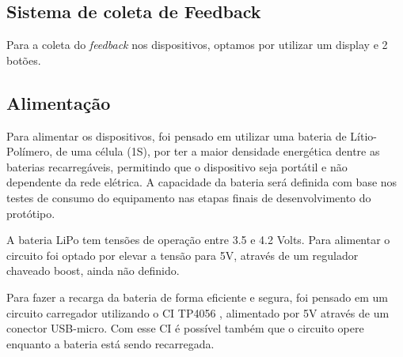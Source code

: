 \documentclass[../monografia.tex]{subfiles}
\begin{document}
\subsection{Sistema de coleta de Feedback}

Para a coleta do \textit{feedback} nos dispositivos, optamos por utilizar um display e 2 botões. 

\subsection{Alimentação}

Para alimentar os dispositivos, foi pensado em utilizar uma bateria de Lítio-Polímero, de uma célula (1S), por ter a maior densidade energética dentre as baterias recarregáveis, permitindo que o dispositivo seja portátil e não dependente da rede elétrica. A capacidade da bateria será definida com base nos testes de consumo do equipamento nas etapas finais de desenvolvimento do protótipo. 

A bateria LiPo tem tensões de operação entre 3.5 e 4.2 Volts. Para alimentar o circuito foi optado por elevar a tensão para 5V, através de um regulador chaveado boost, ainda não definido. 

Para fazer a recarga da bateria de forma eficiente e segura, foi pensado em um circuito carregador utilizando o CI TP4056 \cite{tp4056}, alimentado por 5V através de um conector USB-micro. Com esse CI é possível também que o circuito opere enquanto a bateria está sendo recarregada. 
\end{document}
